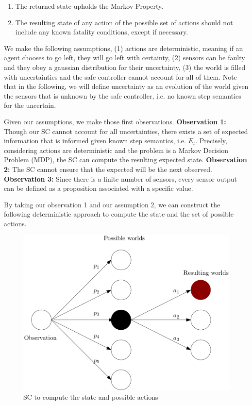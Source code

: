 \documentclass[a4paper,11pt]{article}
\begin{document}
\begin{enumerate}
  \item The returned state upholds the Markov Property.
  \item The resulting state of any action of the possible set of actions 
        should not include any known fatality conditions, except if necessary. 
\end{enumerate}

We make the following assumptions, (1) actions are deterministic, meaning if an agent chooses to go left, they will go left with certainty, 
(2) sensors can be faulty and they obey a gaussian distribution for their uncertainty, (3) the world is filled with uncertainties and the safe controller cannot account 
for all of them. Note that in the following, we will define uncertainty as an evolution of the world given the sensors that is unknown by the safe controller, i.e.
no known step semantics for the uncertain.

\medskip 


Given our assumptions, we make those first observations. \newline
\textbf{Observation 1:} Though our SC cannot account for all uncertainties, there exists a set of expected information that is informed 
given known step semantics, i.e. $E_t$. Precisely, considering actions are deterministic and the problem is a Markov Decision Problem (MDP), the SC can compute the resulting expected state. \newline
\textbf{Observation 2:} The SC cannot ensure that the expected will be the next observed. \newline
\textbf{Observation 3:} Since there is a finite number of sensors, every sensor output can be defined as a proposition associated with a specific value. \newline 

\medskip 

By taking our observation 1 and our assumption 2, we can construct the following deterministic approach to compute the state and the set of possible actions. 


\begin{figure}[H]
  \centering
  \includegraphics[scale=0.55]{scworlds.png}
  \caption{SC to compute the state and possible actions}
  \label{fig:scworld}
\end{figure}
\end{document}
